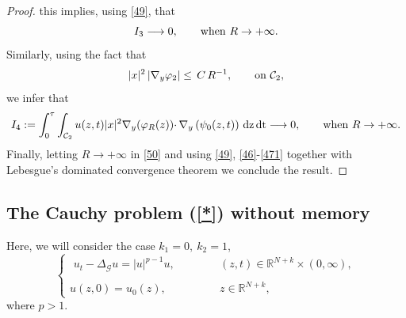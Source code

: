 \documentclass[reqno,11pt]{amsart}
\numberwithin{equation}{section}
\begin{document}
\begin{proof}
	this implies, using \eqref{49}, that
	\begin{equation}\label{47}
		I_3\longrightarrow 0,\qquad \hbox{when}\,\,R\rightarrow+\infty.
	\end{equation}
	Similarly, using the fact that
	$$|x|^2\left|\nabla_y\varphi_2\right|\leq\,C\,{R^{-1}},\qquad\hbox{on}\,\,\mathcal{C}_2,$$
	we infer that
	\begin{equation}\label{471}
		I_4:=\int_0^\tau\int_{\mathcal{C}_2}u(z,t)|x|^2\nabla_y(\varphi_R(z))\cdotp\nabla_y\left(\psi_0(z,t)\right)\,\mathrm{dz}\,\mathrm{dt}\longrightarrow 0,\qquad \hbox{when}\,\,R\rightarrow+\infty.
	\end{equation}
	Finally, letting $R\longrightarrow+\infty$ in \eqref{50} and using \eqref{49}, \eqref{46}-\eqref{471} together with Lebesgue's dominated convergence theorem we conclude the result.
\end{proof}




\subsection{The Cauchy problem (\ref{*})  without memory}


Here, we will consider the case $k_1=0,\ k_2=1$,
\begin{equation}\label{eq1}
	\left\{\begin{array}{ll}
		\,\, \displaystyle {u_{t}-\Delta_{\mathcal{G}}
			u =|u|^{p-1}u,} &\displaystyle {(z,t)\in {\mathbb{R}}^{N+k}\times (0,\infty)},\\
		{}\\
		\displaystyle{u(z,0)=  u_0(z),\qquad\qquad}&\displaystyle{z \in {\mathbb{R}}^{N+k},}
	\end{array}
	\right.
\end{equation} 
where $p>1$.
\end{document}
